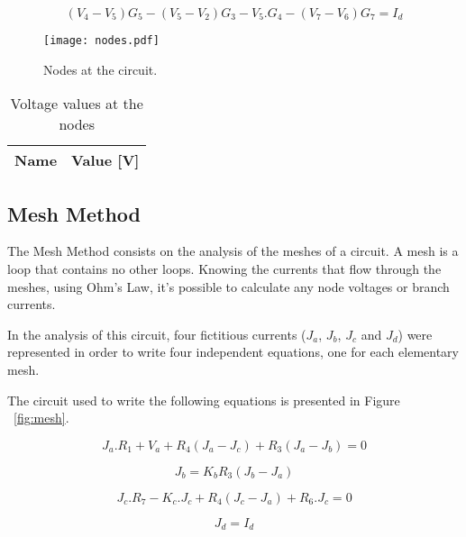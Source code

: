 \begin{equation}
  (V_4 - V_5) G_5 - (V_5 - V_2) G_3 - V_5 . G_4 - (V_7 - V_6) G_7 = I_d
  \label{eq_7}
\end{equation}


\begin{figure}[ht] \centering
\texttt{[image: nodes.pdf]}
\caption{Nodes at the circuit.}
\label{fig:nodes}
\end{figure}

\begin{table}[ht]
  \centering
  \begin{tabular}{|l|r|}
    \hline    
    {\bf Name} & {\bf Value [V]} \\ \hline
    
  \end{tabular}
  \caption{Voltage values at the nodes}
  \label{tab:SolveNos_tab}
\end{table}

\subsection{Mesh Method}

The Mesh Method consists on the analysis of the meshes of a circuit. A mesh is a loop that contains no other loops. Knowing the currents that flow through the meshes, using Ohm's Law, it's possible to calculate any node voltages or branch currents.

In the analysis of this circuit, four fictitious currents ($J_a$, $J_b$, $J_c$ and $J_d$) were represented in order to write four independent equations, one for each elementary mesh.

The circuit used to write the following equations is presented in Figure ~\ref{fig:mesh}.

\begin{equation}
  J_a . R_1 + V_a + R_4 (J_a - J_c) + R_3 (J_a -J_b) = 0
  \label{eq:i_a}
\end{equation}

\begin{equation}
  J_b = K_b  R_3  (J_b - J_a)
  \label{eq:i_b}
\end{equation}

\begin{equation}
  J_c . R_7 - K_c . J_c + R_4 (J_c - J_a) + R_6 . J_c = 0
  \label{eq:i_c}
\end{equation}

\begin{equation}
  J_d = I_d
  \label{eq:i_d}
\end{equation}

